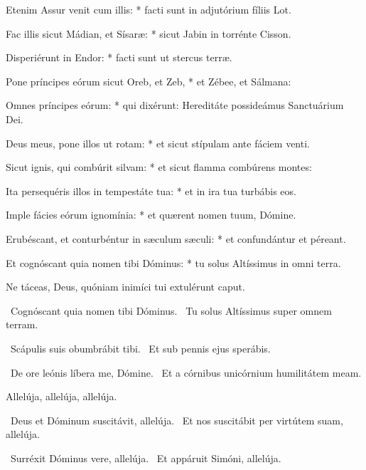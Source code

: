 Etenim Assur venit cum illis: * facti sunt in adjutórium fíliis Lot.

Fac illis sicut Mádian, et Sísaræ: * sicut Jabin in torrénte Cisson.

Disperiérunt in Endor: * facti sunt ut stercus terræ.

Pone príncipes eórum sicut Oreb, et Zeb, * et Zébee, et Sálmana:

Omnes príncipes eórum: * qui dixérunt: Hereditáte possideámus Sanctuárium Dei.

Deus meus, pone illos ut rotam: * et sicut stípulam ante fáciem venti.

Sicut ignis, qui combúrit silvam: * et sicut flamma combúrens montes:

Ita persequéris illos in tempestáte tua: * et in ira tua turbábis eos.

Imple fácies eórum ignomínia: * et quærent nomen tuum, Dómine.

Erubéscant, et conturbéntur in sæculum sæculi: * et confundántur et péreant.

Et cognóscant quia nomen tibi Dóminus: * tu solus Altíssimus in omni terra.


 Ne táceas, Deus, quóniam inimíci tui extulérunt caput.


\V\ Cognóscant quia nomen tibi Dóminus. \R\ Tu solus Altíssimus super omnem terram.


\V\ Scápulis suis obumbrábit tibi. \R\ Et sub pennis ejus sperábis.


\V\ De ore leónis líbera me, Dómine. \R\ Et a córnibus unicórnium humilitátem meam.


 Allelúja, allelúja, allelúja.


\V\ Deus et Dóminum suscitávit, allelúja. \R\ Et nos suscitábit per virtútem suam, allelúja.


\V\ Surréxit Dóminus vere, allelúja. \R\ Et appáruit Simóni, allelúja.

